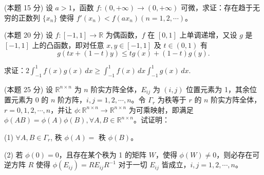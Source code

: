 \documentclass[loose]{ExBook}
\begin{document}
\begin{qitems}
    \begin{bbox}
        \qitem (本题 15 分) 设 \(a > 1\)，函数 \(f : (0, +\infty) \rightarrow (0, +\infty)\) 可微，求证：存在趋于无穷的正数列 \(\{x_n\}\) 使得 \(f'(x_n) < f(ax_n) (n = 1, 2, \cdots)\)。
    \end{bbox}

    \begin{bbox}
        \qitem (本题 20 分) 设 \(f : [-1, 1] \rightarrow \mathbb{R}\) 为偶函数，\(f\) 在 \([0, 1]\) 上单调递增，又设 \(g\) 是 \([-1, 1]\) 上的凸函数，即对任意 \(x, y \in [-1, 1]\) 及 \(t \in (0, 1)\) 有
        \[ g(tx + (1 - t)y) \leq tg(x) + (1 - t)g(y). \]
        
        求证：\(2 \int_{-1}^{1} f(x)g(x) \, dx \geq \int_{-1}^{1} f(x) \, dx \int_{-1}^{1} g(x) \, dx.\)
    \end{bbox}

    \begin{bbox}
        \qitem (本题 25 分) 设 \(\mathbb{R}^{n \times n}\) 为 \(n\) 阶实方阵全体，\(E_{ij}\) 为 \((i, j)\) 位置元素为 1，其余位置元素为 0 的 \(n\) 阶方阵，\(i, j = 1, 2, \cdots, n\)。令 \(\Gamma_r\) 为秩等于 \(r\) 的 \(n\) 阶实方阵全体，\(r = 0, 1, 2, \cdots, n\)，并让 \(\phi : \mathbb{R}^{n \times n} \rightarrow \mathbb{R}^{n \times n}\) 为可乘映射，即满足 \(\phi (AB) = \phi (A)\phi (B), \forall A, B \in \mathbb{R}^{n \times n}\)。试证明：
        
        (1) \(\forall A, B \in \Gamma_r\), 秩 \(\phi(A) = \) 秩 \(\phi(B)\)。
        
        (2) 若 \(\phi(0) = 0\)，且存在某个秩为 1 的矩阵 \(W\)，使得 \(\phi(W) \neq 0\)，则必存在可逆方阵 \(R\) 使得 \(\phi(E_{ij}) = RE_{ij}R^{-1}\) 对于一切 \(E_{ij}\) 皆成立，\(i, j = 1, 2, \cdots, n\)。
    \end{bbox}
\end{qitems}
\end{document}

